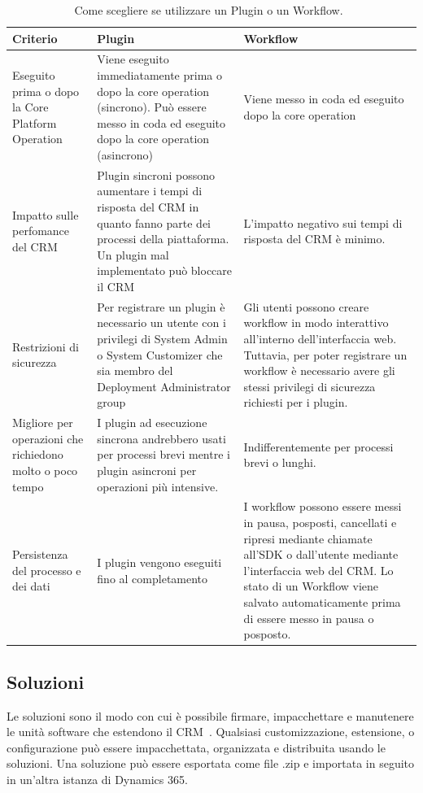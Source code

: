 \begin{table}[ht]
  \centering
  \begin{tabular}{p{}p{}p{}}
    \toprule
      \textbf{Criterio} & \textbf{Plugin} & \textbf{Workflow} \\
    \midrule
    Eseguito prima o dopo la Core Platform Operation & Viene eseguito immediatamente prima o dopo la core operation (sincrono). Può essere messo in coda ed eseguito dopo la core operation (asincrono) & Viene messo in coda ed eseguito dopo la core operation \\
    \midrule
    Impatto sulle perfomance del CRM & Plugin sincroni possono aumentare i tempi di risposta del CRM in quanto fanno parte dei processi della piattaforma. Un plugin mal implementato può bloccare il CRM & L'impatto negativo sui tempi di risposta del CRM è minimo. \\
    \midrule
    Restrizioni di sicurezza & Per registrare un plugin è necessario un utente con i privilegi di System Admin o System Customizer che sia membro del Deployment Administrator group & Gli utenti possono creare workflow in modo interattivo all'interno dell'interfaccia web. Tuttavia, per poter registrare un workflow è necessario avere gli stessi privilegi di sicurezza richiesti per i plugin. \\
    \midrule
    Migliore per operazioni che richiedono molto o poco tempo & I plugin ad esecuzione sincrona andrebbero usati per processi brevi mentre i plugin asincroni per operazioni più intensive. & Indifferentemente per processi brevi o lunghi. \\
    \midrule
    Persistenza del processo e dei dati & I plugin vengono eseguiti fino al completamento & I workflow possono essere messi in pausa, posposti, cancellati e ripresi mediante chiamate all'SDK o dall'utente mediante l'interfaccia web del CRM. Lo stato di un Workflow viene salvato automaticamente prima di essere messo in pausa o posposto. \\
    \bottomrule
  \end{tabular}
  \caption{Come scegliere se utilizzare un Plugin o un Workflow.~\cite{PluginVSWorkflow}}
  \label{table:pluginVsWorkflow}
\end{table}

\subsection{Soluzioni}
Le soluzioni sono il modo con cui è possibile firmare, impacchettare e manutenere le unità software che estendono il CRM~\cite{Solutions}. Qualsiasi customizzazione, estensione, o configurazione può essere impacchettata, organizzata e distribuita usando le soluzioni. Una soluzione può essere esportata come file .zip e importata in seguito in un'altra istanza di Dynamics 365. 

